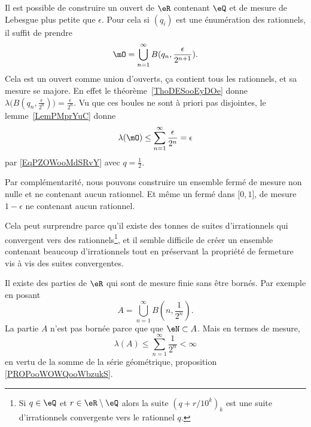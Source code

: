 \begin{example}
	Il est possible de construire un ouvert de \( \eR\) contenant \( \eQ\) et de mesure de Lebesgue plus petite que \( \epsilon\). Pour cela si \( (q_i)\) est une énumération des rationnels, il suffit de prendre
	\begin{equation}
		\mO=\bigcup_{n=1}^{\infty}B(q_n,\frac{ \epsilon }{ 2^{n+1} }).
	\end{equation}
	Cela est un ouvert comme union d'ouverts, ça contient tous les rationnels, et sa mesure se majore. En effet le théorème~\ref{ThoDESooEyDOe} donne \( \lambda\big( B(q_n,\frac{\epsilon }{ 2^n }) \big)=\frac{ \epsilon }{ 2^n }\). Vu que ces boules ne sont à priori pas disjointes, le lemme~\ref{LemPMprYuC} donne
	\begin{equation}
		\lambda(\mO) \leq \sum_{n=1}^{\infty}\frac{ \epsilon }{ 2^n }=\epsilon
	\end{equation}
	par \eqref{EqPZOWooMdSRvY} avec \( q=\frac{ 1 }{2}\).

	Par complémentarité, nous pouvons construire un ensemble fermé de mesure non nulle et ne contenant aucun rationnel. Et même un fermé dans \( \mathopen[ 0 , 1 \mathclose]\), de mesure \( 1-\epsilon\) ne contenant aucun rationnel.

	Cela peut surprendre parce qu'il existe des tonnes de suites d'irrationnels qui convergent vers des rationnels\footnote{Si \( q\in \eQ\) et \( r\in \eR\setminus \eQ\) alors la suite \( (q+r/10^k)_k\) est une suite d'irrationnels convergente vers le rationnel \( q\).}, et il semble difficile de créer un ensemble contenant beaucoup d'irrationnels tout en préservant la propriété de fermeture vis à vis des suites convergentes.
\end{example}

\begin{example}
	Il existe des parties de \( \eR\) qui sont de mesure finie sans être bornés. Par exemple en posant
	\begin{equation}
		A=\bigcup_{n=1}^{\infty}B(n,\frac{1}{ 2^n }).
	\end{equation}
	La partie \( A\) n'est pas bornée parce que que \( \eN\subset A\). Mais en termes de mesure,
	\begin{equation}
		\lambda(A)\leq \sum_{n=1}^{\infty}\frac{1}{ 2^n }<\infty
	\end{equation}
	en vertu de la somme de la série géométrique, proposition \ref{PROPooWOWQooWbzukS}.
\end{example}

